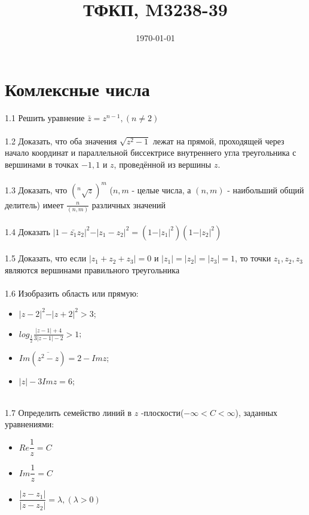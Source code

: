\documentclass{article}
\title{ТФКП, M3238-39}
\date{\today}
\begin{document}
\maketitle

\section{Комлексные числа}
1.1 Решить уравнение $\bar{z} = z^{n-1}, (n \neq 2)$\\ \\
1.2 Доказать, что оба значения $\sqrt{z^2-1}$ лежат на прямой, проходящей через начало координат и параллельной биссектрисе внутреннего угла треугольника с вершинами в точках $-1, 1$ и $z$, проведённой из вершины $z$.\\ \\
1.3 Доказать, что $(^n\sqrt{z})^m$ ($n, m$ - целые числа, а $(n,m)$ - наибольший общий делитель) имеет $\frac{n}{(n, m)}$ различных значений \\ \\
1.4 Доказать $\vert 1 - \bar{z_1} z_2 \vert^2 - \vert z_1 - z_2 \vert ^2 = (1 - \vert z_1 \vert ^2) (1 - \vert z_2 \vert ^2)  $\\ \\
1.5 Доказать, что если $\vert z_1 + z_2 + z_3 \vert  = 0 $  и $\vert z_1 \vert = \vert z_2 \vert = \vert z_3 \vert= 1$, то точки $z_1, z_2, z_3$ являются вершинами правильного треугольника \\ \\
1.6 Изобразить область или прямую: \begin{itemize}
    \item $\vert z-2 \vert^2 - \vert z+2 \vert^2 > 3$;
    \item $log_{\frac{1}{2}}\frac{\vert z - 1 \vert + 4}{3\vert z - 1\vert -2} > 1$;
    \item ${Im}(\overline{z^2-z})=2-{Im} z$;
    \item $\vert z \vert - 3{Im} z=6$;
    \end{itemize}
    \\
1.7 Определить семейство линий в $z$ -плоскости($-\infty < C < \infty$), заданных уравнениями:
\begin{itemize}
	\item $Re \dfrac{1}{z}=C$
	\item $Im \dfrac{1}{z}=C$
	\item $\dfrac{\vert z - z_1 \vert}{\vert z - z_2 \vert}=\lambda, (\lambda > 0)$
\end{itemize}
    
\end{document}
